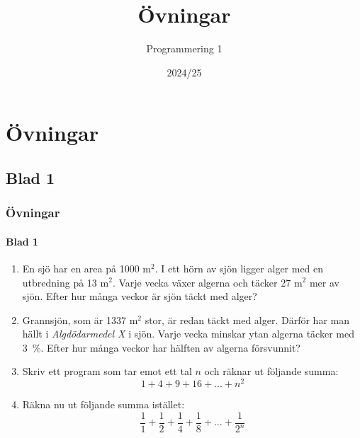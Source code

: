 \documentclass[aspectratio=169]{beamer}
\begin{document}

\title{Övningar}
\date{2024/25}
\author{Programmering 1}

\maketitle

\section{Övningar}

\subsection{Blad 1}

\begin{frame}
	\frametitle{Övningar}
	\framesubtitle{Blad 1}
	
	\begin{enumerate}
		 \item En sjö har en area på 1000 m$^2$. I ett hörn av sjön ligger alger med en utbredning på 13 m$^2$. Varje vecka växer algerna och täcker 27 m$^2$ mer av sjön. Efter hur många veckor är sjön täckt med alger?
		 \item Grannsjön, som är 1337 m$^2$ stor, är redan täckt med alger. Därför har man hällt i \textit{Algdödarmedel X} i sjön. Varje vecka minskar ytan algerna täcker med 3~\%. Efter hur många veckor har hälften av algerna försvunnit?
		 \item Skriv ett program som tar emot ett tal \(n\) och räknar ut följande summa: \[1+4+9+16+...+n^2\]
		 \item Räkna nu ut följande summa istället: \[\dfrac{1}{1}+\dfrac{1}{2}+\dfrac{1}{4}+\dfrac{1}{8}+...+\dfrac{1}{2^n}\]
	\end{enumerate}

\end{frame}
\end{document}
